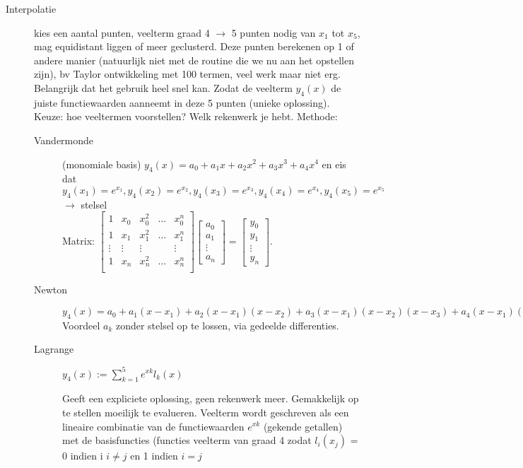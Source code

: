\begin{exam}
\begin{description}
		\item [Interpolatie] kies een aantal punten, veelterm graad 4 $\rightarrow$ 5 punten nodig van $x_1$ tot $x_5$, mag equidistant liggen of meer geclusterd. Deze punten berekenen op 1 of andere manier (natuurlijk niet met de routine die we nu aan het opstellen zijn), bv Taylor ontwikkeling met 100 termen, veel werk maar niet erg. Belangrijk dat het gebruik heel snel kan.
		      Zodat de veelterm $y_4(x)$ de juiste functiewaarden aanneemt in deze 5 punten (unieke oplossing).
		      Keuze: hoe veeltermen voorstellen? Welk rekenwerk je hebt.
		      Methode:
		      \begin{description}
			      \item [Vandermonde] (monomiale basis) $y_4(x)=a_0+a_1 x+a_2 x^2+a_3 x^3+a_4 x^4$ en eis dat $y_4(x_1) = e^{x_1} ,  y_4(x_2) = e^{x_2},y_4(x_3) = e^{x_3},y_4(x_4) = e^{x_4},y_4(x_5) = e^{x_5}$  $\rightarrow$ stelsel \\ Matrix:
			            ${\begin{bmatrix}1&x_{0}&x_{0}^{2}&\ldots &x_{0}^{n}\\1&x_{1}&x_{1}^{2}&\ldots &x_{1}^{n}\\\vdots &\vdots &\vdots &&\vdots \\1&x_{n}&x_{n}^{2}&\ldots &x_{n}^{n}\\\end{bmatrix}}{\begin{bmatrix}a_{0}\\a_{1}\\\vdots \\a_{n}\end{bmatrix}}={\begin{bmatrix}y_{0}\\y_{1}\\\vdots \\y_{n}\end{bmatrix}}.$
			      \item [Newton]  $y_4(x)=a_0+a_1(x-x_1)+a_2(x-x_1)(x-x_2)+a_3(x-x_1)(x-x_2)(x-x_3)+a_4(x-x_1)(x-x_2)(x-x_3)(x-x_4)$
			            Voordeel $a_k$ zonder stelsel op te lossen, via gedeelde differenties.
			      \item [Lagrange]  \begin{form}
				            $y_4(x):=\sum _{k=1}^{5}e^{xk}l_k(x)$
			            \end{form}
			            Geeft een expliciete oplossing, geen rekenwerk meer. Gemakkelijk op te stellen moeilijk te evalueren. Veelterm wordt geschreven als een lineaire combinatie van de functiewaarden $e^{xk}$ (gekende getallen) met de basisfuncties (functies veelterm van graad 4 zodat $l_i(x_j)$ = 0 indien i $i \neq j$ en 1 indien $i=j$

\end{description}
\end{description}
\end{exam}

